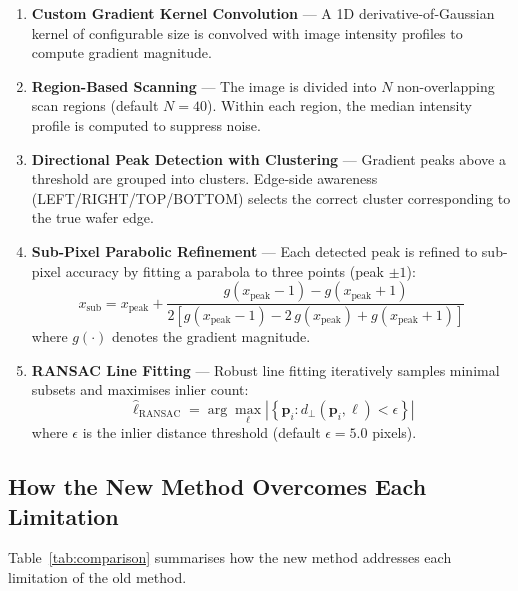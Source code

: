 \documentclass[12pt, a4paper]{article}
\begin{document}
\begin{enumerate}[leftmargin=2cm]
    \item \textbf{Custom Gradient Kernel Convolution} — A 1D derivative-of-Gaussian kernel of configurable size is convolved with image intensity profiles to compute gradient magnitude.
    \item \textbf{Region-Based Scanning} — The image is divided into $N$ non-overlapping scan regions (default $N = 40$). Within each region, the median intensity profile is computed to suppress noise.
    \item \textbf{Directional Peak Detection with Clustering} — Gradient peaks above a threshold are grouped into clusters. Edge-side awareness (LEFT/RIGHT/TOP/BOTTOM) selects the correct cluster corresponding to the true wafer edge.
    \item \textbf{Sub-Pixel Parabolic Refinement} — Each detected peak is refined to sub-pixel accuracy by fitting a parabola to three points (peak $\pm 1$):
    \begin{equation}
        x_{\text{sub}} = x_{\text{peak}} + \frac{g(x_{\text{peak}}-1) - g(x_{\text{peak}}+1)}{2\left[g(x_{\text{peak}}-1) - 2\,g(x_{\text{peak}}) + g(x_{\text{peak}}+1)\right]}
    \end{equation}
    where $g(\cdot)$ denotes the gradient magnitude.
    \item \textbf{RANSAC Line Fitting} — Robust line fitting iteratively samples minimal subsets and maximises inlier count:
    \begin{equation}
        \hat{\ell}_{\text{RANSAC}} = \arg\max_\ell \left| \left\{ \mathbf{p}_i : d_\perp(\mathbf{p}_i, \ell) < \epsilon \right\} \right|
    \end{equation}
    where $\epsilon$ is the inlier distance threshold (default $\epsilon = 5.0$ pixels).
\end{enumerate}

\subsection{How the New Method Overcomes Each Limitation}

Table~\ref{tab:comparison} summarises how the new method addresses each limitation of the old method.
\end{document}
